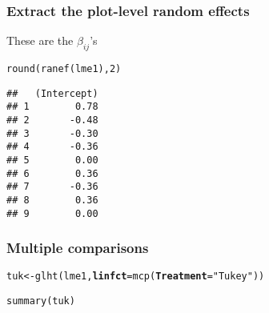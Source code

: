 \documentclass[color=usenames,dvipsnames]{beamer}\usepackage[]{graphicx}\usepackage[]{color}
\makeatletter
\newcommand{\hlnum}[1]{\textcolor[rgb]{0.69,0.494,0}{#1}}%
\newcommand{\hlstr}[1]{\textcolor[rgb]{0.749,0.012,0.012}{#1}}%
\newcommand{\hlstd}[1]{\textcolor[rgb]{0,0,0}{#1}}%
\newcommand{\hlkwb}[1]{\textcolor[rgb]{0,0.341,0.682}{#1}}%
\newcommand{\hlkwc}[1]{\textcolor[rgb]{0,0,0}{\textbf{#1}}}%
\newcommand{\hlkwd}[1]{\textcolor[rgb]{0.004,0.004,0.506}{#1}}%
\newenvironment{kframe}{%
 \def\at@end@of@kframe{}%
 \ifinner\ifhmode%
  \def\at@end@of@kframe{\end{minipage}}%
  \begin{minipage}{\columnwidth}%
 \fi\fi%
 \def\FrameCommand##1{\hskip\@totalleftmargin \hskip-\fboxsep
 \colorbox{shadecolor}{##1}\hskip-\fboxsep
     \hskip-\linewidth \hskip-\@totalleftmargin \hskip\columnwidth}%
 \MakeFramed {\advance\hsize-\width
   \@totalleftmargin\z@ \linewidth\hsize
   \@setminipage}}%
 {\par\unskip\endMakeFramed%
 \at@end@of@kframe}
\newenvironment{knitrout}{}{} %
\makeatother
\begin{document}
\begin{frame}[fragile]
  \frametitle{Extract the plot-level random effects}
  These are the $\beta_{ij}$'s
\begin{knitrout}
\color{fgcolor}\begin{kframe}
\begin{alltt}
\hlkwd{round}\hlstd{(}\hlkwd{ranef}\hlstd{(lme1),} \hlnum{2}\hlstd{)}
\end{alltt}
\begin{verbatim}
##   (Intercept)
## 1        0.78
## 2       -0.48
## 3       -0.30
## 4       -0.36
## 5        0.00
## 6        0.36
## 7       -0.36
## 8        0.36
## 9        0.00
\end{verbatim}
\end{kframe}
\end{knitrout}
\end{frame}



\begin{frame}[fragile]
  \frametitle{Multiple comparisons}
\begin{knitrout}\scriptsize
{}\color{fgcolor}\begin{kframe}
\begin{alltt}
\hlstd{tuk} \hlkwb{<-} \hlkwd{glht}\hlstd{(lme1,} \hlkwc{linfct}\hlstd{=}\hlkwd{mcp}\hlstd{(}\hlkwc{Treatment}\hlstd{=}\hlstr{"Tukey"}\hlstd{))}
\end{alltt}


{\ttfamily\noindent\bfseries{}}\end{kframe}
\end{knitrout}
\pause
\begin{knitrout}\scriptsize
{}\color{fgcolor}\begin{kframe}
\begin{alltt}
\hlkwd{summary}\hlstd{(tuk)}
\end{alltt}


{\ttfamily\noindent\bfseries\color{errorcolor}{\#\# Error in summary(tuk): object 'tuk' not found}}\end{kframe}
\end{knitrout}
\end{frame}
\end{document}
